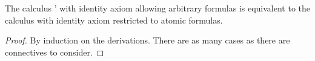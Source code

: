 \begin{lemma}
  The calculus \zss{}' with identity axiom allowing arbitrary formulas is
  equivalent to the calculus \zss{} with identity axiom restricted to atomic
  formulas.
\end{lemma}
\begin{proof}
  By induction on the derivations. There are as many cases as there are
  connectives to consider.

\end{proof}

